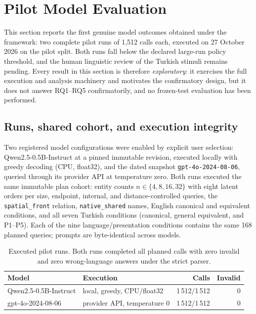 \section{Pilot Model Evaluation}
\label{sec:pilot}

This section reports the first genuine model outcomes obtained under the framework: two complete pilot
runs of 1,512 calls each, executed on 27 October 2026 on the pilot split. Both runs fall below the
declared large-run policy threshold, and the human linguistic review of the Turkish stimuli remains
pending. Every result in this section is therefore \emph{exploratory}: it exercises the full execution and
analysis machinery and motivates the confirmatory design, but it does not answer RQ1--RQ5 confirmatorily,
and no frozen-test evaluation has been performed.

\subsection{Runs, shared cohort, and execution integrity}

Two registered model configurations were enabled by explicit user selection: Qwen2.5-0.5B-Instruct at a
pinned immutable revision, executed locally with greedy decoding (CPU, float32), and the dated snapshot
\texttt{gpt-4o-2024-08-06}, queried through its provider API at temperature zero. Both runs executed the
same immutable plan cohort: entity counts $n \in \{4, 8, 16, 32\}$ with eight latent orders per size,
endpoint, internal, and distance-controlled queries, the \texttt{spatial\_front} relation,
\texttt{native\_shared} names, English canonical and equivalent conditions, and all seven Turkish
conditions (canonical, general equivalent, and P1--P5). Each of the nine language/presentation conditions
contains the same 168 planned queries; prompts are byte-identical across models.

\begin{table}[t]
  \centering
  \caption{Executed pilot runs. Both runs completed all planned calls with zero invalid and zero
  wrong-language answers under the strict parser.}
  \label{tab:pilotruns}
  \small
  \begin{tabular}{@{}llrr@{}}
    \toprule
    Model & Execution & Calls & Invalid \\
    \midrule
    Qwen2.5-0.5B-Instruct & local, greedy, CPU/float32 & 1\,512/1\,512 & 0 \\
    gpt-4o-2024-08-06     & provider API, temperature 0 & 1\,512/1\,512 & 0 \\
    \bottomrule
  \end{tabular}
\end{table}

